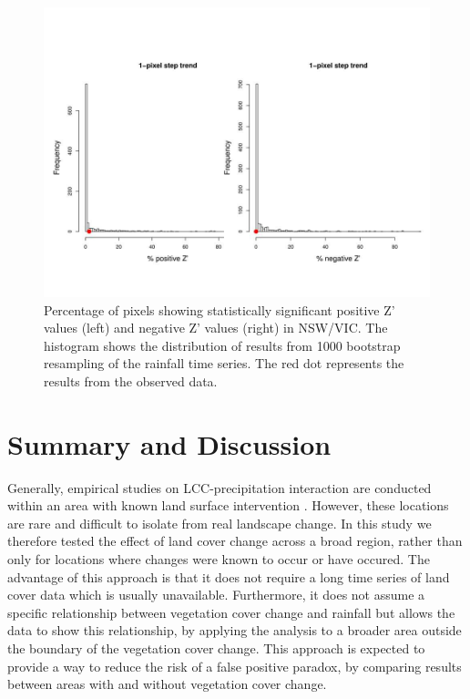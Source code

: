 \documentclass[draft,linenumbers]{agujournal}
\begin{document}
\begin{article}
\begin{figure}[ht]
\centering
\includegraphics[width=6.5in]{bt1_nsw.jpg}
\caption{Percentage of pixels showing statistically significant positive Z' values (left) and negative Z' values (right) in NSW/VIC. The histogram shows the distribution of results from 1000 bootstrap resampling of the rainfall time series. The red dot represents the results from the observed data.}
\label{fig:boot_nsw}
\end{figure}



\section{Summary and Discussion}

Generally, empirical studies on LCC-precipitation interaction are conducted within an area with known land surface intervention \citep[e.g.][]{Otterman1990,Durieux2003,Negri2004,Sato2007}. However, these locations are rare and difficult to isolate from real landscape change. In this study we therefore tested the effect of land cover change across a broad region, rather than only for locations where changes were known to occur or have occured. The advantage of this approach is that it does not require a long time series of land cover data which is usually unavailable. Furthermore, it does not assume a specific relationship between vegetation cover change and rainfall but allows the data to show this relationship, by applying the analysis to a broader area outside the boundary of the vegetation cover change. This approach is expected to provide a way to reduce the risk of a false positive paradox, by comparing results between areas with and without vegetation cover change. %


\end{article}
\end{document}
